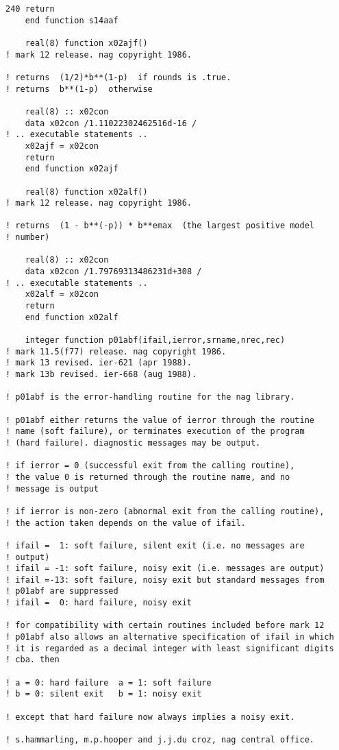 \documentclass[12pt]{article}
\begin{document}
\begin{lstlisting}[frame=single,caption={{\tt d01b.f90}},label=d01b]
    240 return
    end function s14aaf

    real(8) function x02ajf()
! mark 12 release. nag copyright 1986.

! returns  (1/2)*b**(1-p)  if rounds is .true.
! returns  b**(1-p)  otherwise

    real(8) :: x02con
    data x02con /1.11022302462516d-16 /
! .. executable statements ..
    x02ajf = x02con
    return
    end function x02ajf
    
    real(8) function x02alf()
! mark 12 release. nag copyright 1986.

! returns  (1 - b**(-p)) * b**emax  (the largest positive model
! number)

    real(8) :: x02con
    data x02con /1.79769313486231d+308 /
! .. executable statements ..
    x02alf = x02con
    return
    end function x02alf
    
    integer function p01abf(ifail,ierror,srname,nrec,rec)
! mark 11.5(f77) release. nag copyright 1986.
! mark 13 revised. ier-621 (apr 1988).
! mark 13b revised. ier-668 (aug 1988).

! p01abf is the error-handling routine for the nag library.

! p01abf either returns the value of ierror through the routine
! name (soft failure), or terminates execution of the program
! (hard failure). diagnostic messages may be output.

! if ierror = 0 (successful exit from the calling routine),
! the value 0 is returned through the routine name, and no
! message is output

! if ierror is non-zero (abnormal exit from the calling routine),
! the action taken depends on the value of ifail.

! ifail =  1: soft failure, silent exit (i.e. no messages are
! output)
! ifail = -1: soft failure, noisy exit (i.e. messages are output)
! ifail =-13: soft failure, noisy exit but standard messages from
! p01abf are suppressed
! ifail =  0: hard failure, noisy exit

! for compatibility with certain routines included before mark 12
! p01abf also allows an alternative specification of ifail in which
! it is regarded as a decimal integer with least significant digits
! cba. then

! a = 0: hard failure  a = 1: soft failure
! b = 0: silent exit   b = 1: noisy exit

! except that hard failure now always implies a noisy exit.

! s.hammarling, m.p.hooper and j.j.du croz, nag central office.


\end{lstlisting}
\end{document}

